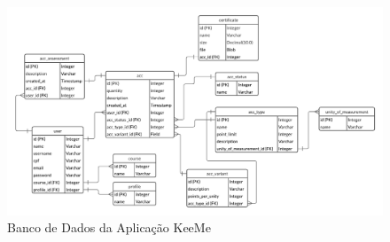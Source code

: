 \begin{figure}[H]
    \centering
    \includegraphics[width=\textwidth]{dados/figuras/Proposta/Diagrama Keep It To Me - v1.0 MVP.pdf}
    \caption{Banco de Dados da Aplicação KeeMe}
    \label{fig:entidadeRelacionamento}
\end{figure}

